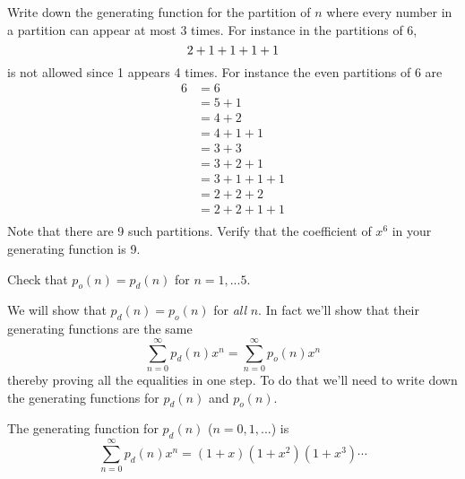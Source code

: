 \newpage
\begin{ex}
Write down the generating function for the partition of $n$ where
every number in a partition can appear at most 3 times.
For instance in the partitions of $6$,
\[
2 + 1 + 1 + 1 + 1 \\
\]
is not allowed since 1 appears 4 times.
For instance the even partitions of 6 are
\begin{align*}
6
&= 6 \\
&= 5 + 1\\
&= 4 + 2 \\
&= 4 + 1 + 1 \\
&= 3 + 3 \\
&= 3 + 2 + 1 \\
&= 3 + 1 + 1 + 1 \\
&= 2 + 2 + 2 \\
&= 2 + 2 + 1 + 1 \\
\end{align*}
Note that there are 9 such partitions.
Verify that the coefficient of $x^6$ in your generating function is 9.
\end{ex}


\newpage
\begin{ex}
Check that $p_o(n) = p_d(n)$ for $n = 1, ... 5$.
\end{ex}


\newpage
We will show that $p_d(n) = p_o(n)$ for \textit{all} $n$.
In fact we'll show that their generating functions are the same
\[
\sum_{n=0}^\infty p_d(n) x^n = 
\sum_{n=0}^\infty p_o(n) x^n 
\]
thereby proving all the equalities in one step.
To do that we'll need to write down the generating functions for $p_d(n)$
and $p_o(n)$.

The generating function for $p_d(n)$ ($n=0,1,...$) is
\[
\sum_{n=0}^\infty p_d(n) x^n
= (1 + x) (1 + x^2) (1 + x^3) \cdots
\]

